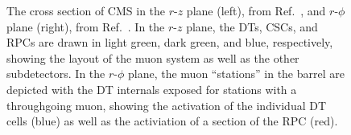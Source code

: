 \begin{figure}[htb]
    \centering
    \quad
    \caption[The cross section of CMS in the $r$-$z$ plane, from Ref.~\cite{CMS:2018rym}, and $r$-$\phi$ plane, from Ref.~\cite{CMSWebMuons}]{
        The cross section of CMS in the $r$-$z$ plane (left), from Ref.~\cite{CMS:2018rym}, and $r$-$\phi$ plane (right), from Ref.~\cite{CMSWebMuons}. 
        In the $r$-$z$ plane, the DTs, CSCs, and RPCs are drawn in light green, dark green, and blue, respectively, showing the layout of the muon system as well as the other subdetectors. 
        In the $r$-$\phi$ plane, the muon ``stations'' in the barrel are depicted with the DT internals exposed for stations with a throughgoing muon, showing the activation of the individual DT cells (blue) as well as the activiation of a section of the RPC (red).
    }
\end{figure}

